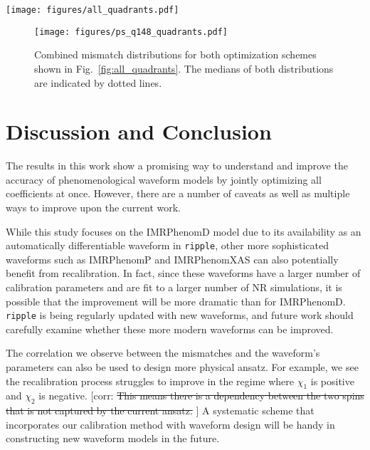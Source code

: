 \documentclass[twocolumn]{aastex631}
\newcommand{\ripple}{\texttt{ripple}}
\newcommand{\corr}[1]{{\color{red}[corr: #1 ]}}
\begin{document}
\begin{figure*}[t]
	\centering
	\texttt{[image: figures/all\_quadrants.pdf]}
	\caption{Distributions of mismatches for both split region optimization and all region optimization in all 4 
	regions. We use a constant PSD to calculate the mismatch and
	$\mathcal{L}_{\mathrm{ave}}$ as the loss function. The medians of each distribution are indicated by dotted
	lines.}
	\label{fig:all_quadrants}
\end{figure*}

\begin{figure}[t]
	\centering
	\texttt{[image: figures/ps\_q148\_quadrants.pdf]}
	\caption{Combined mismatch distributions for both optimization schemes shown in Fig.~\ref{fig:all_quadrants}. The medians of both distributions are indicated by dotted lines. }
	\label{fig:ps_q148_quadrant}
\end{figure}

\section{Discussion and Conclusion} \label{sec:discussion}

The results in this work show a promising way to understand and improve the
accuracy of phenomenological waveform models by jointly optimizing all
coefficients at once. However, there are a number of caveats as well
as multiple ways to improve upon the current work.

While this study focuses on the IMRPhenomD model due to its availability as an
automatically differentiable waveform in \ripple, other more sophisticated waveforms such as
IMRPhenomP \citep{hannam2014simple, khan2019phenomenological} and IMRPhenomXAS
\citep{pratten2020setting,pratten2021computationally} can also potentially benefit
from recalibration. In fact, since these waveforms have a larger number of calibration
parameters and are fit to a larger number of NR simulations, it is possible that the 
improvement will be more dramatic than for IMRPhenomD. {\ripple} is being regularly
updated with new waveforms, and future work should carefully examine whether these more
modern waveforms can be improved. 

The correlation we observe between the mismatches and the waveform's parameters
can also be used to design more physical ansatz. For example, we see the
recalibration process struggles to improve in the regime where $\chi_{1}$ is
positive and $\chi_{2}$ is negative. \corr{\sout{This means there is a dependency between
the two spins} \sout{that is not captured by the current ansatz.}} A systematic scheme that
incorporates our calibration method with waveform design will be handy in
constructing new waveform models in the future. 
\end{document}
